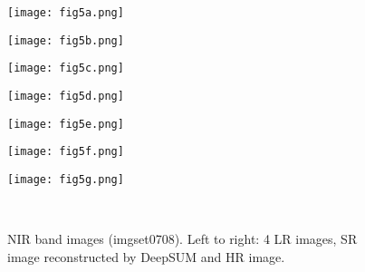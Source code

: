\documentclass[journal]{IEEEtran}
\begin{document}
\begin{figure*}[t]
  \centering
    \begin{minipage}[b]{\textwidth}
        \begin{minipage}[c]{0.15\textwidth}
        \texttt{[image: fig5a.png]}
        \end{minipage}
        \hfill
        \begin{minipage}[c]{0.15\textwidth}
        \texttt{[image: fig5b.png]}
        \end{minipage}
        \hfill
        \begin{minipage}[c]{0.15\textwidth}
        \texttt{[image: fig5c.png]}
        \end{minipage}
        \hfill
        \begin{minipage}[c]{0.15\textwidth}
        \texttt{[image: fig5d.png]}
        \end{minipage}
        \hfill
        \begin{minipage}[c]{0.15\textwidth}
        \texttt{[image: fig5e.png]}
        \end{minipage}
        \hfill
        \begin{minipage}[c]{0.15\textwidth}
        \texttt{[image: fig5f.png]}
        \end{minipage}
        \hfill
        \begin{minipage}[c]{0.041\textwidth}
        \texttt{[image: fig5g.png]}
        \end{minipage}
        
    \end{minipage}\\
\caption{NIR band images (imgset0708). Left to right: 4 LR images, SR image reconstructed by DeepSUM and HR image.}
  \label{fig:many_lr_nir}
\end{figure*}
\end{document}
